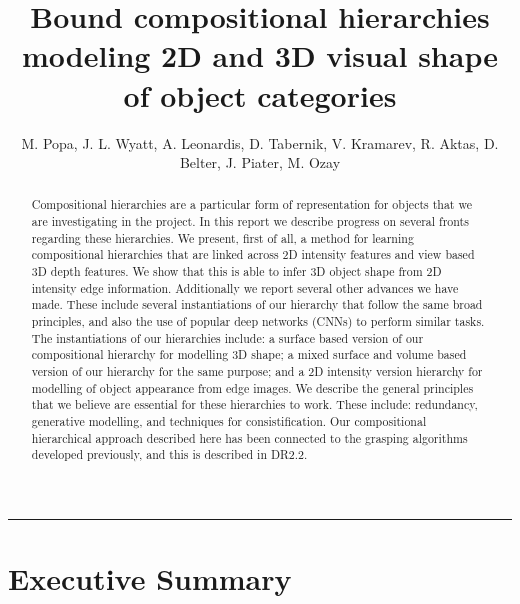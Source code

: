 \documentclass[a4paper,11pt,pdf]{../templates/pacmanreport}
\title{Bound compositional hierarchies modeling 2D and 3D visual shape of object categories}
\author{M. Popa, J. L. Wyatt, A. Leonardis, D. Tabernik, V. Kramarev, R. Aktas, D. Belter, J. Piater, M. Ozay}
\begin{document}
\maketitle

\begin{abstract}
\noindent Compositional hierarchies are a particular form of representation for objects that we are investigating in the project. In this report we describe progress on several fronts regarding these hierarchies. We present, first of all, a method for learning compositional hierarchies that are linked across 2D intensity features and view based 3D depth features. We show that this is able to infer 3D object shape from 2D intensity edge information. Additionally we report several other advances we have made. These include several instantiations of our hierarchy that follow the same broad principles, and also the use of popular deep networks (CNNs) to perform similar tasks. The instantiations of our hierarchies include: a surface based version of our compositional hierarchy for modelling 3D shape; a mixed surface and volume based version of our hierarchy for the same purpose; and a 2D intensity version hierarchy for modelling of object appearance from edge images. We describe the general principles that we believe are essential for these hierarchies to work. These include: redundancy, generative modelling, and techniques for consistification. Our compositional hierarchical approach described here has been connected to the grasping algorithms developed previously, and this is described in DR2.2.
\end{abstract}


\vspace{.2em}
\hrule

\footnotesize

\tableofcontents

\normalsize

\newpage

\section*{Executive Summary}

\end{document}
